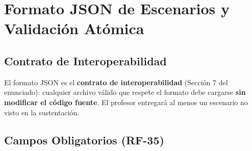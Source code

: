 \chapter{Formato JSON de Escenarios y Validación Atómica}
\label{ch:json}

\section{Contrato de Interoperabilidad}
\label{sec:contrato-json}



El formato JSON es el \textbf{contrato de interoperabilidad} (Sección 7 del enunciado):
cualquier archivo válido que respete el formato debe cargarse \textbf{sin modificar el código
fuente}. El profesor entregará al menos un escenario no visto en la sustentación.

\section{Campos Obligatorios (RF-35)}
\label{sec:campos-obligatorios}

